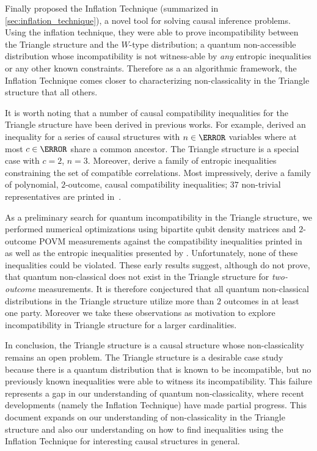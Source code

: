 \documentclass[aps, 10pt, english, twoside, pra, nofootinbib, tightenlines, longbibliography, superscriptaddress]{revtex4-1}
\begin{document}
    Finally \citet{Inflation} proposed the Inflation Technique (summarized in \cref{sec:inflation_technique}), a novel tool for solving causal inference problems. Using the inflation technique, they were able to prove incompatibility between the Triangle structure and the $W$-type distribution; a quantum non-accessible distribution whose incompatibility is not witness-able by \textit{any} entropic inequalities or any other known constraints. Therefore as a an algorithmic framework, the Inflation Technique comes closer to characterizing non-classicality in the Triangle structure that all others.

    It is worth noting that a number of causal compatibility inequalities for the Triangle structure have been derived in previous works. For example, \citet{Steudel_2010} derived an inequality for a series of causal structures with $n \in \N$ variables where at most $c \in \N$ share a common ancestor. The Triangle structure is a special case with $c = 2$, $n = 3$. Moreover, \citet{Henson_2014} derive a family of entropic inequalities constraining the set of compatible correlations. Most impressively, \citet{Inflation} derive a family of polynomial, $2$-outcome, causal compatibility inequalities; $37$ non-trivial representatives are printed in~\cite{Inflation}.

    As a preliminary search for quantum incompatibility in the Triangle structure, we performed numerical optimizations using bipartite qubit density matrices and $2$-outcome POVM measurements against the compatibility inequalities printed in~\cite{Inflation} as well as the entropic inequalities presented by \citet{Henson_2014}. Unfortunately, none of these inequalities could be violated. These early results suggest, although do not prove, that quantum non-classical does not exist in the Triangle structure for \textit{two-outcome} measurements. It is therefore conjectured that all quantum non-classical distributions in the Triangle structure utilize more than $2$ outcomes in at least one party. Moreover we take these observations as motivation to explore incompatibility in Triangle structure for a larger cardinalities.


    In conclusion, the Triangle structure is a causal structure whose non-classicality remains an open problem. The Triangle structure is a desirable case study because there is a quantum distribution that is known to be incompatible, but no previously known inequalities were able to witness its incompatibility. This failure represents a gap in our understanding of quantum non-classicality, where recent developments (namely the Inflation Technique) have made partial progress. This document expands on our understanding of non-classicality in the Triangle structure and also our understanding on how to find inequalities using the Inflation Technique for interesting causal structures in general.
\end{document}
